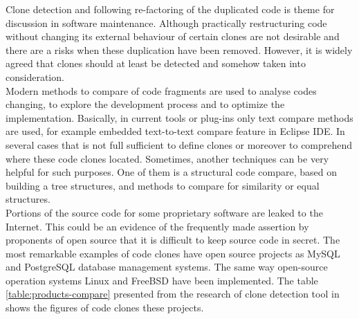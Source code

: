 \documentclass{report}
\begin{document}
Clone detection and following re-factoring of the duplicated code is theme for discussion in software maintenance. Although practically restructuring code without changing its external behaviour of certain clones are not desirable and there are a risks when these duplication have been removed. However, it is widely agreed that clones should at least be detected and somehow taken into consideration.
\\
Modern methods to compare of code fragments are used to analyse codes changing, to explore the development process and to optimize the implementation. Basically, in current tools or plug-ins only text compare methods are used, for example embedded text-to-text compare feature in Eclipse IDE. In several cases that is not full sufficient to define clones or moreover to comprehend where these code clones located. Sometimes, another techniques can be very helpful for such purposes. One of them is a structural code compare, based on building a tree structures, and methods to compare for similarity or equal structures.
\\ 
Portions of the source code for some proprietary software are leaked to the Internet. This could be an evidence of the frequently made assertion by proponents of open source that it is difficult to keep source code in secret. The most remarkable examples of code clones have open source projects as MySQL and PostgreSQL database management systems. The same way open-source operation systems Linux and FreeBSD have been implemented. The table \ref{table:products-compare} presented from the research of clone detection tool in \cite{CP-Miner} shows the figures of code clones these projects.
\end{document}
